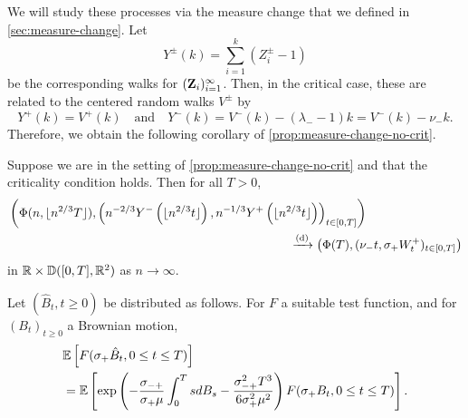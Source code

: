 We will study these processes via the measure change that we defined in \cref{sec:measure-change}. Let
\begin{equation*}
  Y^{\pm}(k) = \sum_{i=1}^k (Z_i^{\pm} - 1)
\end{equation*}
be the corresponding walks for $({\mathbf Z}_i)_{i=1}^{\infty}$. Then, in the critical case, these are related to the centered random walks $V^{\pm}$ by
\begin{equation*}
  Y^+(k) = V^+(k)
  \quad \text{and} \quad
  Y^-(k) = V^-(k) - (\lambda_- - 1) k = V^-(k) - \nu_- k.
\end{equation*}
Therefore, we obtain the following corollary of \cref{prop:measure-change-no-crit}.
\begin{corollary}
  \label{cor:measure-change}
  Suppose we are in the setting of \cref{prop:measure-change-no-crit} and that the criticality condition holds. Then for all $T > 0$,
  \begin{align*}
      &\left( 
          \Phi(n, \floor{n^{2/3} T}),
          \left(
              n^{-2/3} Y^-\left( \floor{n^{2/3} t} \right),
              n^{-1/3} Y^+\left( \floor{n^{2/3} t} \right)
          \right)_{t \in [0, T]}
      \right) \\
      & \hspace{23em} \todist \left( 
          \Phi(T),
          (\nu_- t, \sigma_+ W^+_t)_{t \in [0, T]}
      \right)
  \end{align*}
  in ${\mathbb R} \times {\mathbb D}([0, T], {\mathbb R}^2)$ as $n \to \infty$.
\end{corollary}
Let $(\hat{B}_t,t\geq 0)$ be distributed as follows. For $F$ a suitable test function, and for $(B_t)_{t\geq 0}$ a Brownian motion,
\begin{align*} &{\mathbb E}\left[F(\sigma_+ \hat{B}_t,0\leq t \leq T)\right]\\&={\mathbb E}\left[\exp\left(-\frac{\sigma_{-+}}{\sigma_+ \mu} \int_0^T s dB_s -\frac{\sigma_{-+}^2 T^3}{6\sigma_+^2 \mu^2}\right)F(\sigma_+ B_t,   0\leq t \leq T)\right].\end{align*}

 

